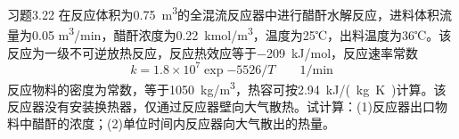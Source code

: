 \documentclass[dvipsnames, svgnames, x11names]{beamer}
\begin{document}
\begin{frame}[t]{}
    \vspace{-9pt}
    \begin{block}{习题3.22}
        在反应体积为\SI{0.75}{m^3}的全混流反应器中进行醋酐水解反应，进料体积流量为0.05 \si{m^3/min}，醋酐浓度为\SI{0.22}{kmol/m^3}，温度为25℃，出料温度为36℃。该反应为一级不可逆放热反应，反应热效应等于\SI{-209}{kJ/mol}，反应速率常数
        \[
            k=1.8 \times 10^7 \exp{-5526/T} \qquad 1/\mathrm{min}
        \]
        反应物料的密度为常数，等于\SI{1050}{kg/m^3}，热容可按\SI{2.94}{kJ/(kg.K)}计算。该反应器没有安装换热器，仅通过反应器壁向大气散热。试计算：(1)反应器出口物料中醋酐的浓度；(2)单位时间内反应器向大气散出的热量。
        \tcblower
    \end{block}
\end{frame}
\end{document}
